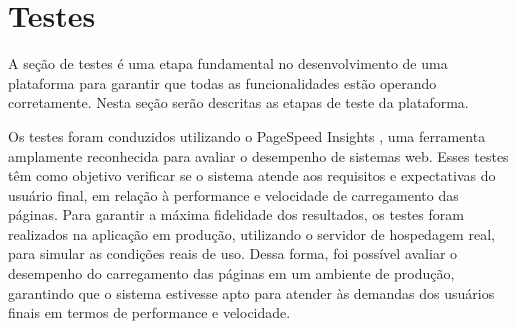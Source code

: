 \documentclass[tcc,capa]{texufpel}
\begin{document}
\section{Testes}
\label{sec:testes}
A seção de testes é uma etapa fundamental no desenvolvimento de uma plataforma para garantir que todas as funcionalidades estão operando corretamente. Nesta seção serão descritas as etapas de teste da plataforma.



Os testes %
foram conduzidos utilizando o PageSpeed Insights \cite{PageSpeedInsights:2023}, uma ferramenta amplamente reconhecida para avaliar o desempenho de sistemas web. Esses testes têm como objetivo verificar se o sistema atende aos requisitos e expectativas do usuário final, em relação à performance e velocidade de carregamento das páginas. Para garantir a máxima fidelidade dos resultados, os testes foram realizados na aplicação em produção, utilizando o servidor de hospedagem real, para simular as condições reais de uso. Dessa forma, foi possível avaliar o desempenho do carregamento das páginas em um ambiente de produção, garantindo que o sistema estivesse apto para atender às demandas dos usuários finais em termos de performance e velocidade.

\end{document}
